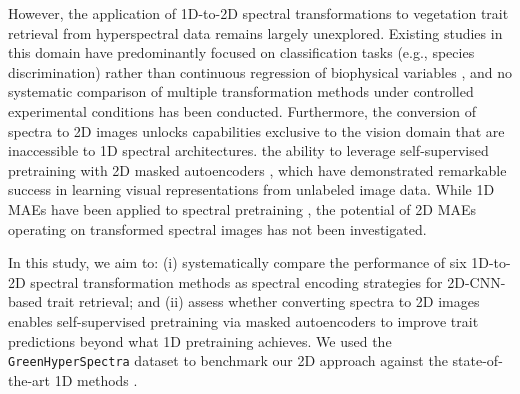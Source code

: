 However, the application of 1D-to-2D spectral transformations to vegetation trait retrieval from hyperspectral data remains largely unexplored. Existing studies in this domain have predominantly focused on classification tasks (e.g., species discrimination) rather than continuous regression of biophysical variables \citep{hennessy2022reshaping}, and no systematic comparison of multiple transformation methods under controlled experimental conditions has been conducted. Furthermore, the conversion of spectra to 2D images unlocks capabilities exclusive to the vision domain that are inaccessible to 1D spectral architectures.  the ability to leverage self-supervised pretraining with 2D masked autoencoders \citep{he2022mae}, which have demonstrated remarkable success in learning visual representations from unlabeled image data. While 1D MAEs have been applied to spectral pretraining \citep{cherif2025greenhyperspectra}, the potential of 2D MAEs operating on transformed spectral images has not been investigated.

In this study, we aim to: (i) systematically compare the performance of six 1D-to-2D spectral transformation methods as spectral encoding strategies for 2D-CNN-based trait retrieval; and (ii) assess whether converting spectra to 2D images enables self-supervised pretraining via masked autoencoders to improve trait predictions beyond what 1D pretraining achieves. We used the \texttt{GreenHyperSpectra} dataset to benchmark our 2D approach against the state-of-the-art 1D methods \citep{cherif2025greenhyperspectra}. 
